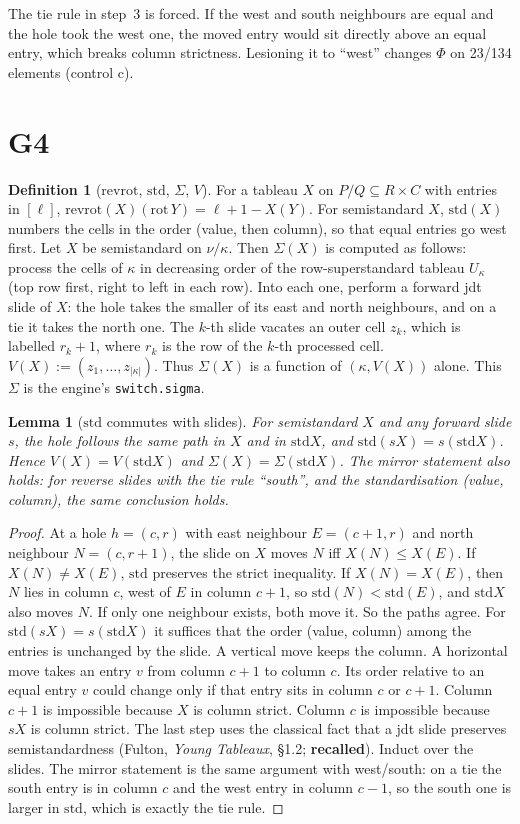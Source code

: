 \documentclass[11pt]{article}
\newtheorem{lemma}[theorem]{Lemma}
\theoremstyle{definition}
\newtheorem{definition}[theorem]{Definition}
\newcommand{\std}{\mathrm{std}}
\newcommand{\rr}{\mathrm{revrot}}
\begin{document}
The tie rule in step~3 is forced. If the west and south neighbours are equal and the hole took the west one, the moved
entry would sit directly above an equal entry, which breaks column strictness. Lesioning it to ``west'' changes $\Phi$
on 23/134 elements (control c).

\section{G4}\label{sec:G4}
\begin{definition}[$\rr$, $\std$, $\Sigma$, $V$]
For a tableau $X$ on $P/Q\subseteq R\times C$ with entries in $[\ell]$, $\rr(X)(\mathrm{rot}\,Y)=\ell+1-X(Y)$. For semistandard $X$,
$\std(X)$ numbers the cells in the order (value, then column), so that equal entries go west first. Let $X$ be semistandard on
$\nu/\kappa$. Then $\Sigma(X)$ is computed as follows: process the cells of $\kappa$ in decreasing order of the row-superstandard tableau
$U_\kappa$ (top row first, right to left in each row). Into each one, perform a forward jdt slide of $X$: the hole takes the smaller of its
east and north neighbours, and on a tie it takes the north one. The $k$-th slide vacates an outer cell $z_k$, which is labelled
$r_k+1$, where $r_k$ is the row of the $k$-th processed cell. $V(X):=(z_1,\dots,z_{|\kappa|})$. Thus $\Sigma(X)$ is a
function of $(\kappa,V(X))$ alone. This $\Sigma$ is the engine's \texttt{switch.sigma}.
\end{definition}

\begin{lemma}[$\std$ commutes with slides]\label{lem:A}
For semistandard $X$ and any forward slide $s$, the hole follows the same path in $X$ and in $\std X$, and
$\std(sX)=s(\std X)$. Hence $V(X)=V(\std X)$ and $\Sigma(X)=\Sigma(\std X)$. The mirror statement also holds: for reverse
slides with the tie rule ``south'', and the standardisation (value, column), the same conclusion holds.
\end{lemma}
\begin{proof}
At a hole $h=(c,r)$ with east neighbour $E=(c+1,r)$ and north neighbour $N=(c,r+1)$, the slide on $X$ moves $N$ iff
$X(N)\le X(E)$. If $X(N)\ne X(E)$, $\std$ preserves the strict inequality. If $X(N)=X(E)$, then $N$ lies in column $c$, west
of $E$ in column $c+1$, so $\std(N)<\std(E)$, and $\std X$ also moves $N$. If only one neighbour exists, both move it. So the
paths agree. For $\std(sX)=s(\std X)$ it suffices that the order (value, column) among the entries is unchanged by the slide. A
vertical move keeps the column. A horizontal move takes an entry $v$ from column $c+1$ to column $c$. Its order relative to an
equal entry $v$ could change only if that entry sits in column $c$ or $c+1$. Column $c+1$ is impossible because $X$ is column
strict. Column $c$ is impossible because $sX$ is column strict. The last step uses the classical fact that a jdt slide
preserves semistandardness (Fulton, \emph{Young Tableaux}, \S1.2; \textbf{recalled}). Induct over the slides. The mirror
statement is the same argument with west/south: on a tie the south entry is in column $c$ and the west entry in column $c-1$,
so the south one is larger in $\std$, which is exactly the tie rule.
\end{proof}
\end{document}

